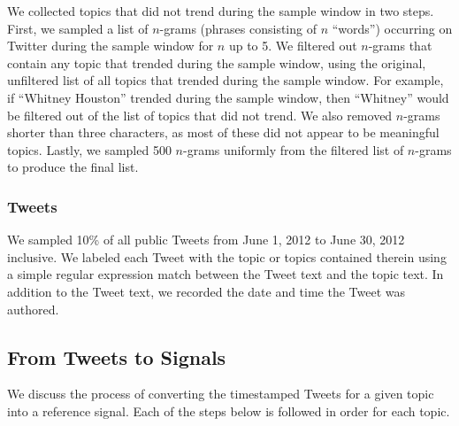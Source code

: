 We collected topics that did not trend during the sample window in two
steps. First, we sampled a list of $n$-grams (phrases consisting of $n$
``words'') occurring on Twitter during the sample window for $n$ up to 5. We
filtered out $n$-grams that contain any topic that trended during the sample
window, using the original, unfiltered list of all topics that trended during
the sample window. For example, if ``Whitney Houston'' trended during the sample
window, then ``Whitney'' would be filtered out of the list of topics that
did not trend. We also removed $n$-grams shorter than three characters, as most
of these did not appear to be meaningful topics. Lastly, we sampled 500
$n$-grams uniformly from the filtered list of $n$-grams to produce the final
list.

\subsubsection{Tweets}
We sampled 10\% of all public Tweets from June 1, 2012 to June 30, 2012
inclusive. We labeled each Tweet with the topic or topics contained therein
using a simple regular expression match between the Tweet text and the topic
text. In addition to the Tweet text, we recorded the date and time the Tweet was
authored.

\subsection{From Tweets to Signals}
We discuss the process of converting the timestamped Tweets for a given topic
into a reference signal. Each of the steps below is followed in order for each
topic.

